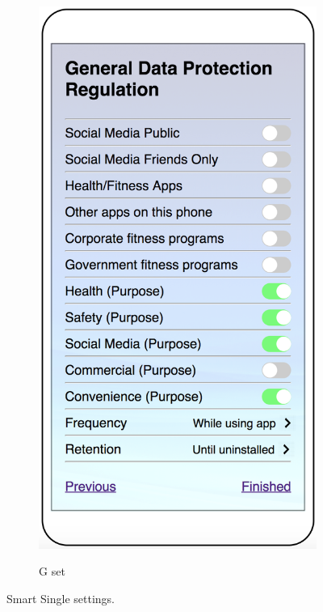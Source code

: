 \begin{figure}
\begin{subfigure}[b]{0.24\textheight}
		\includegraphics[width=0.24\textheight]{figures/default4.png}
		\label{fig:defaultd}
		\caption{G set}
	\end{subfigure}
	\caption{Smart Single settings.}
	\label{fig:default}
\end{figure}


